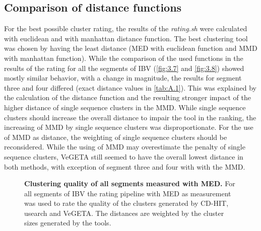     \subsection{Comparison of distance functions}
    
    For the best possible cluster rating, the results of the \textit{rating.sh} were calculated with euclidean and with manhattan distance function. The best clustering tool was chosen by having the least distance (\gls{MED} with euclidean function and \gls{MMD} with manhattan function). While the comparison of the used functions in the results of the rating for all the segments of \gls{IBV} (\autoref{fig:3.7} and \autoref{fig:3.8}) showed mostly similar behavior, with a change in magnitude, the results for segment three and four differed (exact distance values in \autoref{tab:A.1}). This was explained by the calculation of the distance function and the resulting stronger impact of the higher distance of single sequence clusters in the \gls{MMD}. While single sequence clusters should increase the overall distance to impair the tool in the ranking, the increasing of \gls{MMD} by single sequence clusters was disproportionate. For the use of \gls{MMD} as distance, the weighting of single sequence clusters should be reconsidered. While the using of \gls{MMD} may overestimate the penalty of single sequence clusters, VeGETA still seemed to have the overall lowest distance in both methods, with exception of segment three and four with with the \gls{MMD}. 
    
    \begin{figure}[!htb]
        \centering
        \caption[Clustering quality of all segments measured with \gls{MED}]{\textbf{Clustering quality of all segments measured with \gls{MED}.} For all segments of \gls{IBV} the rating pipeline with \gls{MED} as measurement was used to rate the quality of the clusters generated by CD-HIT, usearch and VeGETA. The distances are weighted by the cluster sizes generated by the tools.}
        \label{fig:3.7}
    \end{figure}
    
